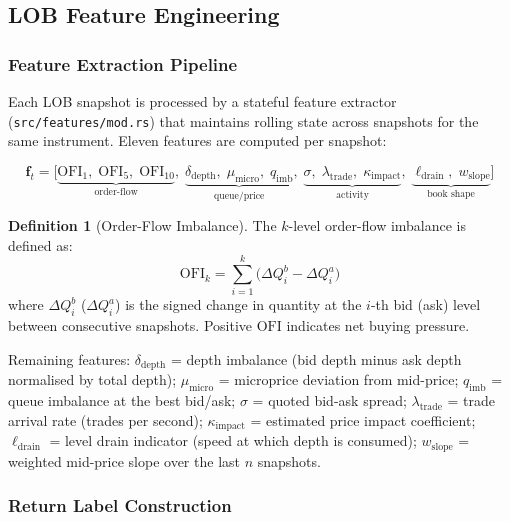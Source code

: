 \documentclass[12pt,a4paper]{article}
\theoremstyle{definition}
\newtheorem{definition}{Definition}[section]
\theoremstyle{remark}
\newcommand{\OFI}{\mathrm{OFI}}
\newcommand{\code}[1]{\texttt{\small #1}}
\begin{document}
\subsection{LOB Feature Engineering}
\label{sec:features}

\subsubsection{Feature Extraction Pipeline}

Each LOB snapshot is processed by a stateful feature extractor
(\code{src/\allowbreak features/\allowbreak mod.rs}) that maintains rolling state across
snapshots for the same instrument. Eleven features are computed
per snapshot:

\begin{equation}
\mathbf{f}_t = \bigl[
  \underbrace{\OFI_1,\;\OFI_5,\;\OFI_{10}}_{\text{order-flow}},\;
  \underbrace{\delta_\mathrm{depth},\;\mu_\mathrm{micro},\;q_\mathrm{imb}}_{\text{queue/price}},\;
  \underbrace{\sigma,\;\lambda_\mathrm{trade},\;\kappa_\mathrm{impact}}_{\text{activity}},\;
  \underbrace{\ell_\mathrm{drain},\;w_\mathrm{slope}}_{\text{book shape}}
\bigr]
\label{eq:features}
\end{equation}

\begin{definition}[Order-Flow Imbalance]
The $k$-level order-flow imbalance is defined as:
\begin{equation}
  \OFI_k = \sum_{i=1}^{k}\bigl(\Delta Q^b_i - \Delta Q^a_i\bigr)
\end{equation}
where $\Delta Q^b_i$ ($\Delta Q^a_i$) is the signed change in quantity
at the $i$-th bid (ask) level between consecutive snapshots. Positive
$\OFI$ indicates net buying pressure.
\end{definition}

Remaining features: $\delta_\mathrm{depth}$ = depth imbalance
(bid depth minus ask depth normalised by total depth);
$\mu_\mathrm{micro}$ = microprice deviation from mid-price;
$q_\mathrm{imb}$ = queue imbalance at the best bid/ask;
$\sigma$ = quoted bid-ask spread;
$\lambda_\mathrm{trade}$ = trade arrival rate (trades per second);
$\kappa_\mathrm{impact}$ = estimated price impact coefficient;
$\ell_\mathrm{drain}$ = level drain indicator (speed at which depth is
consumed); $w_\mathrm{slope}$ = weighted mid-price slope over the last
$n$ snapshots.

\subsubsection{Return Label Construction}
\end{document}

